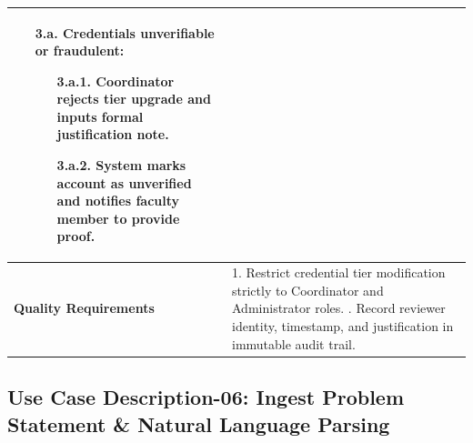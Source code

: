 \begin{table}[H]
\begin{tabularx}{\textwidth}{|l|X|}
\begin{itemize}[leftmargin=*]
    \item[\textbf{3.a.}] \textbf{Credentials unverifiable or fraudulent:}
    \begin{itemize}[leftmargin=*]
        \item[3.a.1.] Coordinator rejects tier upgrade and inputs formal justification note.
        \item[3.a.2.] System marks account as unverified and notifies faculty member to provide proof.
    \end{itemize}
\end{itemize} \\ \hline
\textbf{Quality Requirements} & 
1. Restrict credential tier modification strictly to Coordinator and Administrator roles. \newline
2. Record reviewer identity, timestamp, and justification in immutable audit trail. \\ \hline
\end{tabularx}
\end{table}

\clearpage
\subsection{Use Case Description-06: Ingest Problem Statement \& Natural Language Parsing}
\label{subsec:uc06}

